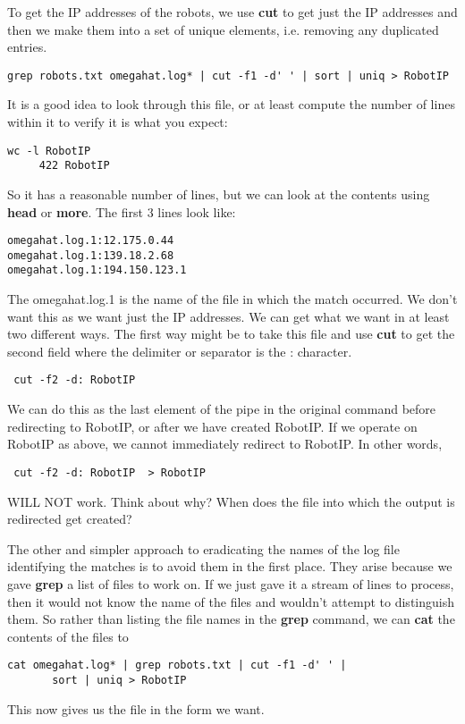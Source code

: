 \documentclass[10pt]{article}
\def\executable#1{\textbf{#1}}
\begin{document}
\begin{enumerate}
To get the IP addresses of the robots, we use \executable{cut}
to get just the IP addresses and then we make them into a set
of unique elements, i.e. removing any duplicated entries.
\begin{verbatim}
grep robots.txt omegahat.log* | cut -f1 -d' ' | sort | uniq > RobotIP
\end{verbatim}
It is a good idea to look through this file, or at least compute the number of
lines within it to verify it is what you expect:
\begin{verbatim}
wc -l RobotIP 
     422 RobotIP
\end{verbatim}
So it has a reasonable number of lines, but we can look at the contents
using \executable{head} or \executable{more}.
The first $3$ lines look like:
\begin{verbatim}
omegahat.log.1:12.175.0.44
omegahat.log.1:139.18.2.68
omegahat.log.1:194.150.123.1
\end{verbatim}
The omegahat.log.1 is the name of the file in which the match occurred.
We don't want this as we want just the IP addresses.
We can get what we want in at least two different ways.
The first way might be to take this file and use
\executable{cut} to get the second field where the delimiter or separator
is the : character.
\begin{verbatim}
 cut -f2 -d: RobotIP  
\end{verbatim}
We can do this as the last element of the pipe in the original command before redirecting
to RobotIP,  or after we have created RobotIP. If we operate on RobotIP as above, 
we cannot immediately redirect to RobotIP.
In other words,
\begin{verbatim}
 cut -f2 -d: RobotIP  > RobotIP
\end{verbatim}
WILL NOT work.   Think about why? When does the file into which the output is redirected
get created?

The other and simpler approach to eradicating the names of the log file identifying the matches
is to avoid them in the first place.
They arise because we gave \executable{grep} a list of files  to work on.
If we just gave it a stream of lines to process, then it would not know the name
of the files and wouldn't  attempt to distinguish them. 
So rather than listing the file names in the \executable{grep} command, we can
\executable{cat} the contents of the files to 
\begin{verbatim}
cat omegahat.log* | grep robots.txt | cut -f1 -d' ' | 
       sort | uniq > RobotIP
\end{verbatim}
This now gives us the file in the form we want.



\end{enumerate}
\end{document}
